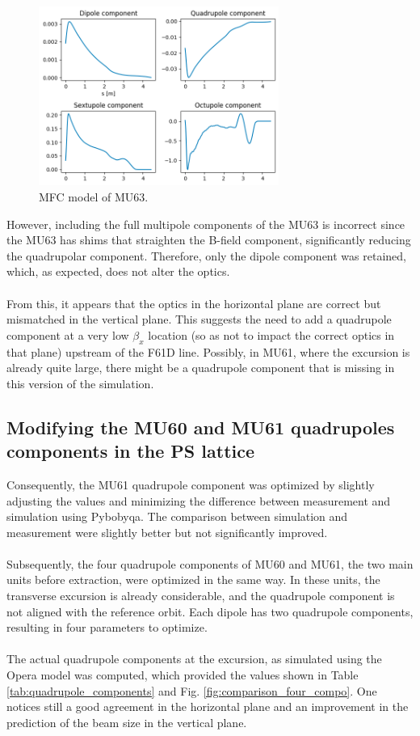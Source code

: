 \begin{figure}[H]
\centering
\includegraphics[width=0.7\textwidth]{02_Simulation/images/mfc_mu63.png}
\caption{MFC model of MU63.}
\label{fig:mfc_mu63}
\end{figure}

However, including the full multipole components of the MU63 is incorrect since the MU63 has shims that straighten the B-field component, significantly reducing the quadrupolar component. Therefore, only the dipole component was retained, which, as expected, does not alter the optics.
\\
\\
From this, it appears that the optics in the horizontal plane are correct but mismatched in the vertical plane. This suggests the need to add a quadrupole component at a very low $\beta_{x}$ location (so as not to impact the correct optics in that plane) upstream of the F61D line. Possibly, in MU61, where the excursion is already quite large, there might be a quadrupole component that is missing in this version of the simulation.

\subsection{Modifying the MU60 and MU61 quadrupoles components in the PS lattice}
Consequently, the MU61 quadrupole component was optimized by slightly adjusting the values and minimizing the difference between measurement and simulation using Pybobyqa. The comparison between simulation and measurement were slightly better but not significantly improved.
\\
\\
Subsequently, the four quadrupole components of MU60 and MU61, the two main units before extraction, were optimized in the same way. In these units, the transverse excursion is already considerable, and the quadrupole component is not aligned with the reference orbit. Each dipole has two quadrupole components, resulting in four parameters to optimize.
\\
\\
The actual quadrupole components at the excursion, as simulated using the Opera model was computed, which provided the values shown in Table \ref{tab:quadrupole_components} and Fig. \ref{fig:comparison_four_compo}. One notices still a good agreement in the horizontal plane and an improvement in the prediction of the beam size in the vertical plane.

